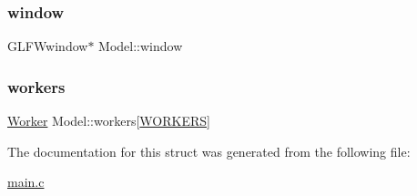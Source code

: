 \mbox{\label{structModel_af15f84653ef65888f996e6b78c1d6ff7}} 
\subsubsection{\texorpdfstring{window}{window}}
{\footnotesize\ttfamily G\+L\+F\+Wwindow$\ast$ Model\+::window}

\mbox{\label{structModel_af82468267fcf9f7720dd378e0a46bad7}} 
\subsubsection{\texorpdfstring{workers}{workers}}
{\footnotesize\ttfamily \hyperlink{structWorker}{Worker} Model\+::workers\mbox{[}\hyperlink{main_8c_a9e7244aa346409fc55b405b70d87f774}{W\+O\+R\+K\+E\+RS}\mbox{]}}



The documentation for this struct was generated from the following file\+:\begin{DoxyCompactItemize}
\item 
\hyperlink{main_8c}{main.\+c}\end{DoxyCompactItemize}
